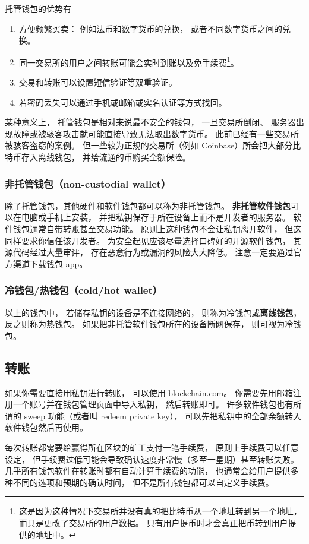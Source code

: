 托管钱包的优势有
\begin{enumerate}
\item 方便频繁买卖： 例如法币和数字货币的兑换， 或者不同数字货币之间的兑换。
\item 同一交易所的用户之间转账可能会实时到账以及免手续费\footnote{这是因为这种情况下交易所并没有真的把比特币从一个地址转到另一个地址， 而只是更改了交易所的用户数据。 只有用户提币时才会真正把币转到用户提供的地址中。}。
\item 交易和转账可以设置短信验证等双重验证。
\item 若密码丢失可以通过手机或邮箱或实名认证等方式找回。
\end{enumerate}
某种意义上， 托管钱包是相对来说最不安全的钱包， 一旦交易所倒闭、 服务器出现故障或被骇客攻击就可能直接导致无法取出数字货币。 此前已经有一些交易所被骇客盗窃的案例。 但一些较为正规的交易所（例如 Coinbase）所会把大部分比特币存入离线钱包， 并给流通的币购买全额保险。

\subsubsection{非托管钱包（non-custodial wallet）}
除了托管钱包，其他硬件和软件钱包都可以称为非托管钱包。 \textbf{非托管软件钱包}可以在电脑或手机上安装， 并把私钥保存于所在设备上而不是开发者的服务器。 软件钱包通常自带转账甚至交易功能。 原则上这种钱包不会让私钥离开软件， 但这同样要求你信任该开发者。 为安全起见应该尽量选择口碑好的开源软件钱包， 其源代码经过大量审评， 存在恶意行为或漏洞的风险大大降低。 注意一定要通过官方渠道下载钱包 app。

\subsubsection{冷钱包/热钱包（cold/hot wallet）}
以上的钱包中， 若储存私钥的设备是不连接网络的， 则称为冷钱包或\textbf{离线钱包}， 反之则称为热钱包。 如果把非托管软件钱包所在的设备断网保存， 则可视为冷钱包。


\subsection{转账}
如果你需要直接用私钥进行转账， 可以使用 \href{https://blockchain.com}{blockchain.com}。 你需要先用邮箱注册一个账号并在钱包管理页面中导入私钥， 然后转账即可。 许多软件钱包也有所谓的 sweep 功能（或者叫 redeem private key）， 可以先把私钥中的全部余额转入软件钱包然后再使用。

每次转账都需要给赢得所在区块的矿工支付一笔手续费， 原则上手续费可以任意设定， 但手续费过低可能会导致确认速度非常慢（多至一星期）甚至转账失败。 几乎所有钱包软件在转账时都有自动计算手续费的功能， 也通常会给用户提供多种不同的选项和预期的确认时间， 但不是所有钱包都可以自定义手续费。

